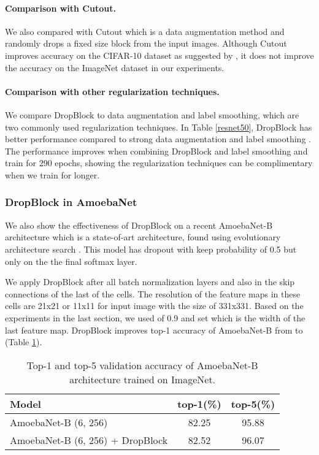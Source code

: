\documentclass{article}
\begin{document}
\paragraph{Comparison with Cutout.}
We also compared with Cutout \cite{Cutout2017} which is a data augmentation method and randomly drops a fixed size block from the input images. Although Cutout improves accuracy on the CIFAR-10 dataset as suggested by \cite{Cutout2017}, it does not improve the accuracy on the ImageNet dataset in our experiments.

\paragraph{Comparison with other regularization techniques.}
 We compare DropBlock to data augmentation and label smoothing, which are two commonly used regularization techniques. In Table \ref{resnet50}, DropBlock has better performance compared to strong data augmentation \cite{cubuk2018autoaugment} and label smoothing \cite{smoothsoftmax2015}. The performance improves when combining DropBlock and label smoothing and train for 290 epochs, showing the regularization techniques can be complimentary when we train for longer.

\subsubsection{DropBlock in AmoebaNet}
We also show the effectiveness of DropBlock on a recent AmoebaNet-B
architecture which is a state-of-art architecture, found using evolutionary architecture search \cite{real2018regularized}.
This model has dropout with keep probability of 0.5 but only on the the final softmax layer.

We apply DropBlock after all batch normalization layers and also in the skip connections
of the last  of the cells. The resolution of the feature maps in these cells are 21x21 or 11x11 for input image with the size of 331x331. Based on the experiments in the last section, we used  of 0.9 and set  which is the width of the last feature map.
DropBlock improves top-1 accuracy of AmoebaNet-B from  to  (Table \ref{fig:AmoebaNet}).

\begin{table}[h!]
  \centering
        \begin{tabular}{l|cc}
            \hline
              \footnotesize Model  & \footnotesize top-1(\%) & \footnotesize top-5(\%)\\
            \hline \hline
            \footnotesize AmoebaNet-B (6, 256)                      & \footnotesize 82.25  &  95.88 \\
            \footnotesize AmoebaNet-B (6, 256) + DropBlock & \footnotesize 82.52  &  96.07 \\
        \hline
        \end{tabular}
  \caption{Top-1 and top-5 validation accuracy of AmoebaNet-B architecture trained on ImageNet.}
  \label{fig:AmoebaNet}
\end{table}
\end{document}
